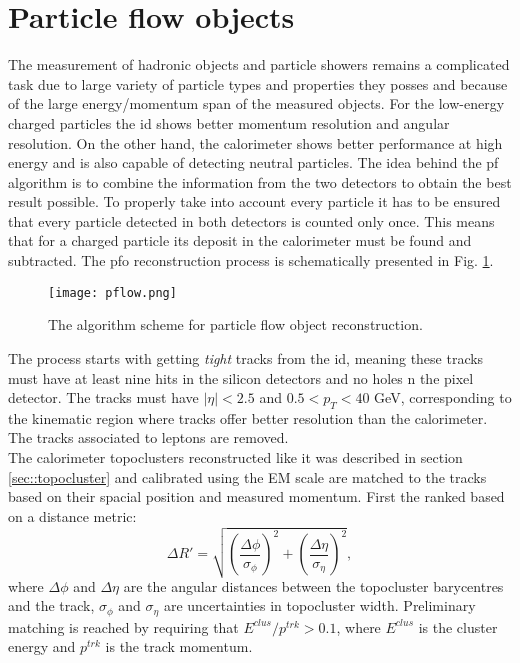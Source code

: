       \section{Particle flow objects}
      \label{sec:pfo}
      The measurement of hadronic objects and particle showers remains a complicated task due to large variety of particle types and properties they posses and because of the large energy/momentum span of the measured objects. For the low-energy charged particles the \gls{id} shows better momentum resolution and angular resolution. On the other hand, the calorimeter shows better performance at high energy and is also capable of detecting neutral particles. The idea behind the \gls{pf} algorithm \cite{pflow} is to combine the information from the two detectors to obtain the best result possible. To properly take into account every particle it has to be ensured that every particle detected in both detectors is counted only once. This means that for a charged particle its deposit in the calorimeter must be found and subtracted. The \gls{pfo} reconstruction process is schematically presented in Fig. \ref{fig::pflow}.
      	\begin{figure}[htbp]
      	\centering
      	\texttt{[image: pflow.png]}
      	\caption[pflow]{The algorithm scheme for particle flow object reconstruction.}
      	\label{fig::pflow}
      \end{figure}
  	  The process starts with getting \textit{tight} tracks from the \gls{id}, meaning these tracks must have at least nine hits in the silicon detectors and no holes n the pixel detector. The tracks must have $|\eta| < 2.5$ and $0.5 < p_T < 40$ GeV, corresponding to the kinematic region where tracks offer better resolution than the calorimeter. The tracks associated to leptons are removed. \\
  	  The calorimeter topoclusters reconstructed like it was described in section \ref{sec::topocluster} and calibrated using the EM scale are matched to the tracks based on their spacial position and measured momentum. First the ranked based on a distance metric:
  	  	\begin{equation}
  	  \Delta R'=\sqrt{\left(\frac{\Delta \phi}{\sigma_{\phi}}\right)^2+\left(\frac{\Delta \eta}{\sigma_{\eta}}\right)^2},
  	  \end{equation}
  	  where $\Delta \phi$ and $\Delta \eta$ are the angular distances between the topocluster barycentres and the track, $\sigma_{\phi}$ and $\sigma_{\eta}$ are uncertainties in topocluster width. Preliminary matching is reached by requiring that $E^{clus}/p^{trk}>0.1$, where $E^{clus}$ is the cluster energy and $p^{trk}$ is the track momentum.\\
